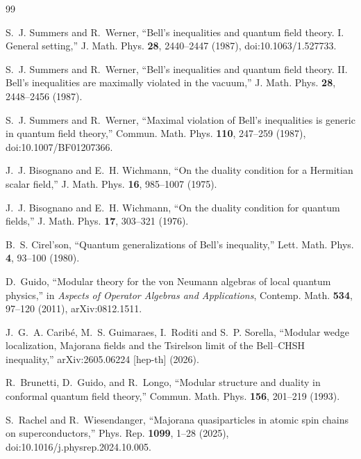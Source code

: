 \documentclass[11pt]{article}
\begin{document}
\begin{thebibliography}{99}

S.~J. Summers and R.~Werner,
``Bell's inequalities and quantum field theory. I. General setting,''
J. Math. Phys. \textbf{28}, 2440--2447 (1987),
doi:10.1063/1.527733.

S.~J. Summers and R.~Werner,
``Bell's inequalities and quantum field theory. II. Bell's inequalities are maximally violated in the vacuum,''
J. Math. Phys. \textbf{28}, 2448--2456 (1987).

S.~J. Summers and R.~Werner,
``Maximal violation of Bell's inequalities is generic in quantum field theory,''
Commun. Math. Phys. \textbf{110}, 247--259 (1987),
doi:10.1007/BF01207366.

J.~J. Bisognano and E.~H. Wichmann,
``On the duality condition for a Hermitian scalar field,''
J. Math. Phys. \textbf{16}, 985--1007 (1975).

J.~J. Bisognano and E.~H. Wichmann,
``On the duality condition for quantum fields,''
J. Math. Phys. \textbf{17}, 303--321 (1976).

B.~S. Cirel'son,
``Quantum generalizations of Bell's inequality,''
Lett. Math. Phys. \textbf{4}, 93--100 (1980).

D.~Guido,
``Modular theory for the von Neumann algebras of local quantum physics,''
in \emph{Aspects of Operator Algebras and Applications},
Contemp. Math. \textbf{534}, 97--120 (2011), arXiv:0812.1511.

J.~G.~A. Carib\'e, M.~S. Guimaraes, I.~Roditi and S.~P. Sorella,
``Modular wedge localization, Majorana fields and the Tsirelson limit of the Bell--CHSH inequality,''
arXiv:2605.06224 [hep-th] (2026).

R.~Brunetti, D.~Guido, and R.~Longo,
``Modular structure and duality in conformal quantum field theory,''
Commun. Math. Phys. \textbf{156}, 201--219 (1993).

S.~Rachel and R.~Wiesendanger,
``Majorana quasiparticles in atomic spin chains on superconductors,''
Phys. Rep. \textbf{1099}, 1--28 (2025),
doi:10.1016/j.physrep.2024.10.005.

\end{thebibliography}
\end{document}
